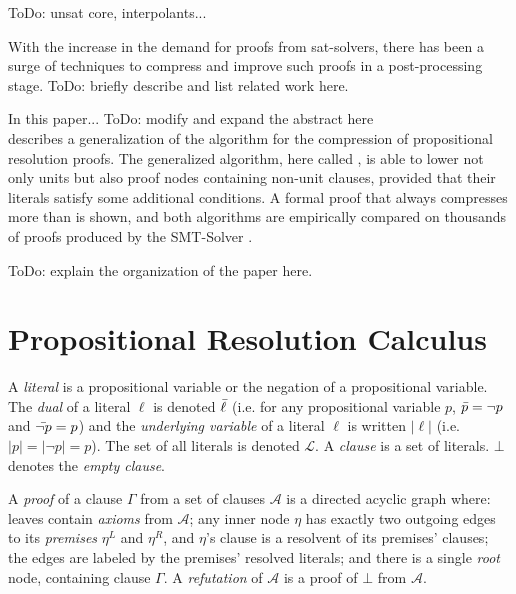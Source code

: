 \documentclass{llncs}
\begin{document}
ToDo: unsat core, interpolants...

With the increase in the demand for proofs from sat-solvers, there has been a surge of techniques to
compress and improve such proofs in a post-processing stage. ToDo: briefly describe and list related
work here.

In this paper...  ToDo: modify and expand the abstract here\\
 describes a generalization of the {\LowerUnits} algorithm \cite{LURPI} for the compression
of propositional resolution proofs. The generalized algorithm, here called {\LowerUnivalents}, is
able to lower not only units but also proof nodes containing non-unit clauses, provided that their
literals satisfy some additional conditions. A formal proof that {\LowerUnivalents} always
compresses more than {\LowerUnits} is shown, and both algorithms are empirically compared on
thousands of proofs produced by the SMT-Solver \veriT.

ToDo: explain the organization of the paper here.


\section{Propositional Resolution Calculus}

A \emph{literal} is a propositional variable or the negation of a propositional variable. The \emph{dual} of a literal $\ell$ is denoted
$\bar{\ell}$ (i.e. for any propositional variable $p$, $\bar{p} =
\neg p$ and $\bar{\neg p} = p$) and the \emph{underlying variable} of a literal
$\ell$ is written $|\ell|$ (i.e. $|p| = |\neg p| = p$). The set of all literals is denoted $\mathcal{L}$. A \emph{clause} is a set of literals. $\bot$ denotes the \emph{empty clause}.


\noindent
A \emph{proof} of a clause $\Gamma$ from a set of clauses $\mathcal{A}$ is a
directed acyclic graph where: leaves contain \emph{axioms} from $\mathcal{A}$;
any inner node $\eta$ has exactly two outgoing edges to its \emph{premises} $\eta^L$ and $\eta^R$, and $\eta$'s clause is a resolvent of its premises' clauses; the edges are labeled by the premises'
resolved literals; and there is a single \emph{root} node, containing clause $\Gamma$. A \emph{refutation} of $\mathcal{A}$ is a proof of $\bot$ from $\mathcal{A}$.
\end{document}
